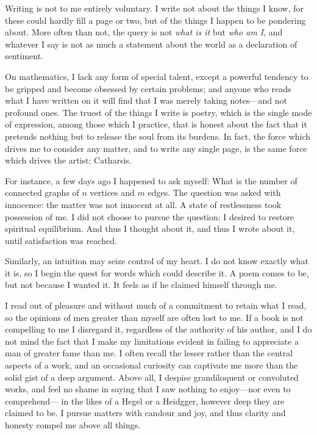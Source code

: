 \documentclass[a4paper, 12pt]{article}
\begin{document}
Writing is not to me entirely voluntary. I write not about the things I know,
for these could hardly fill a page or two, but of the things I happen to be
pondering about. More often than not, the query is not \textit{what is it} but
\textit{who am I}, and whatever I say is not as much a statement about the
world as a declaration of sentiment.

On mathematics, I lack any form of special talent, except a powerful tendency
to be gripped and become obsessed by certain problems; and anyone who reads
what I have written on it will find that I was merely taking notes---and not
profound ones. The truest of the things I write is poetry, which is the single
mode of expression, among those which I practice, that is honest about the fact
that it pretends nothing but to release the soul from its burdens. In fact, the
force which drives me to consider any matter, and to write any single page, is
the same force which drives the artist: Catharsis.

For instance, a few days ago I happened to ask myself: What is the number of
connected graphs of $n$ vertices and $m$ edges. The question was asked with
innocence: the matter was not innocent at all. A state of restlessness took
possession of me. I did not choose to pursue the question: I desired to restore
spiritual equilibrium. And thus I thought about it, and thus I wrote about
it, until satisfaction was reached.

Similarly, an intuition may seize control of my heart. I do not know exactly
what it is, so I begin the quest for words which could describe it. A poem
comes to be, but not because I wanted it. It feels as if he claimed himself
through me.

I read out of pleasure and without much of a commitment to retain what I read,
so the opinions of men greater than myself are often lost to me. If a book is
not compelling to me I disregard it, regardless of the authority of his author,
and I do not mind the fact that I make my limitations evident in failing to
appreciate a man of greater fame than me. I often recall the lesser rather than
the central aspects of a work, and an occasional curiosity can captivate me
more than the solid gist of a deep argument. Above all, I despise grandiloquent
or convoluted works, and feel no shame in saying that I saw nothing to
enjoy---nor even to comprehend--- in the likes of a Hegel or a Heidgger,
however deep they are claimed to be. I pursue matters with candour and joy, and
thus clarity and honesty compel me above all things.
\end{document}

